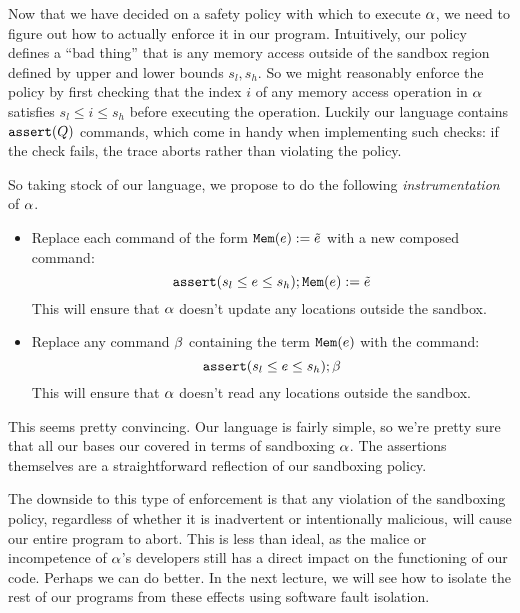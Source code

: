 \documentclass[11pt,twoside]{scrartcl}
\begin{document}
Now that we have decided on a safety policy with which to execute $\alpha$, we need to figure out how to actually enforce it in our program. Intuitively, our policy defines a ``bad thing'' that is any memory access outside of the sandbox region defined by upper and lower bounds $s_l, s_h$. So we might reasonably enforce the policy by first checking that the index $i$ of any memory access operation in $\alpha$ satisfies $s_l \le i \le s_h$ before executing the operation. Luckily our language contains $\texttt{\upshape assert}(Q)$ commands, which come in handy when implementing such checks: if the check fails, the trace aborts rather than violating the policy.

So taking stock of our language, we propose to do the following \emph{instrumentation} of $\alpha$.
\begin{itemize}
  \item Replace each command of the form $\texttt{\upshape Mem}(e):=\tilde{e}$ with a new composed command:
  \[
  \texttt{\upshape assert}(s_l \le e \le s_h); \texttt{\upshape Mem}(e):=\tilde{e}
  \]
  This will ensure that $\alpha$ doesn't update any locations outside the sandbox.

  \item Replace any command $\beta$ containing the term $\texttt{\upshape Mem}(e)$ with the command:
  \[
  \texttt{\upshape assert}(s_l \le e \le s_h); \beta
  \]
  This will ensure that $\alpha$ doesn't read any locations outside the sandbox.
\end{itemize}
This seems pretty convincing. Our language is fairly simple, so we're pretty sure that all our bases our covered in terms of sandboxing $\alpha$. The assertions themselves are a straightforward reflection of our sandboxing policy.

The downside to this type of enforcement is that any violation of the sandboxing policy, regardless of whether it is inadvertent or intentionally malicious, will cause our entire program to abort. This is less than ideal, as the malice or incompetence of $\alpha$'s developers still has a direct impact on the functioning of our code. Perhaps we can do better. In the next lecture, we will see how to isolate the rest of our programs from these effects using software fault isolation.

% 
% 
\end{document}
